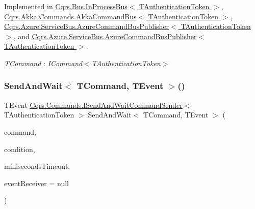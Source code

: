 Implemented in \hyperlink{classCqrs_1_1Bus_1_1InProcessBus_ac8c4a77edc761f15e16c638624424443_ac8c4a77edc761f15e16c638624424443}{Cqrs.\+Bus.\+In\+Process\+Bus$<$ T\+Authentication\+Token $>$}, \hyperlink{classCqrs_1_1Akka_1_1Commands_1_1AkkaCommandBus_a80fe44ab4ef2dc64260f2e27a673b91c_a80fe44ab4ef2dc64260f2e27a673b91c}{Cqrs.\+Akka.\+Commands.\+Akka\+Command\+Bus$<$ T\+Authentication\+Token $>$}, \hyperlink{classCqrs_1_1Azure_1_1ServiceBus_1_1AzureCommandBusPublisher_aa04a7f8ad0bc192d1e8d2cfce09d1290_aa04a7f8ad0bc192d1e8d2cfce09d1290}{Cqrs.\+Azure.\+Service\+Bus.\+Azure\+Command\+Bus\+Publisher$<$ T\+Authentication\+Token $>$}, and \hyperlink{classCqrs_1_1Azure_1_1ServiceBus_1_1AzureCommandBusPublisher_aa04a7f8ad0bc192d1e8d2cfce09d1290_aa04a7f8ad0bc192d1e8d2cfce09d1290}{Cqrs.\+Azure.\+Service\+Bus.\+Azure\+Command\+Bus\+Publisher$<$ T\+Authentication\+Token $>$}.

\begin{Desc}
\item[Type Constraints]\begin{description}
\item[{\em T\+Command} : {\em I\+Command$<$T\+Authentication\+Token$>$}]\end{description}
\end{Desc}
\mbox{\label{interfaceCqrs_1_1Commands_1_1ISendAndWaitCommandSender_a230c249fa137eafc9857c3b73ae86fcd_a230c249fa137eafc9857c3b73ae86fcd}} 
\subsubsection{\texorpdfstring{Send\+And\+Wait$<$ T\+Command, T\+Event $>$()}{SendAndWait< TCommand, TEvent >()}\hspace{0.1cm}{\footnotesize\ttfamily [5/6]}}
{\footnotesize\ttfamily T\+Event \hyperlink{interfaceCqrs_1_1Commands_1_1ISendAndWaitCommandSender}{Cqrs.\+Commands.\+I\+Send\+And\+Wait\+Command\+Sender}$<$ T\+Authentication\+Token $>$.Send\+And\+Wait$<$ T\+Command, T\+Event $>$ (\begin{DoxyParamCaption}\item[{T\+Command}]{command,  }\item[{Func$<$ I\+Enumerable$<$ \hyperlink{interfaceCqrs_1_1Events_1_1IEvent}{I\+Event}$<$ T\+Authentication\+Token $>$$>$, T\+Event $>$}]{condition,  }\item[{int}]{milliseconds\+Timeout,  }\item[{\hyperlink{interfaceCqrs_1_1Events_1_1IEventReceiver}{I\+Event\+Receiver}$<$ T\+Authentication\+Token $>$}]{event\+Receiver = {\ttfamily null} }\end{DoxyParamCaption})}



